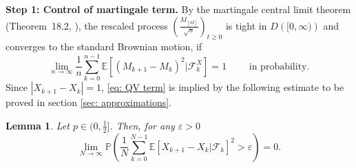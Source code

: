 \documentclass[twoside,12pt, a4paper]{article}
\newtheorem{lemma}{Lemma}[section]
\numberwithin{equation}{section}
\theoremstyle{remark}
\newcommand{\abs}[1]{\left\vert #1 \right\vert}
\begin{document}
	\vspace{1em}
	
	\textbf{Step 1: Control of martingale term.}
	 By the martingale central limit theorem (Theorem~18.2, \cite{B99}), the rescaled process $\left( \frac{M_{\left\lfloor n t \right\rfloor}}{\sqrt{n}} \right) _{t \ge 0}$ is tight in $D\left( [0,\infty ) \right) $ and converges to the standard Brownian motion, if
	\begin{equation}\label{eq: QV term}
		\lim_{n\to \infty}\frac{1}{n} \sum_{k=0}^{n-1}\mathbb{E}\left[ (M_{k+1}- M_{k})^2 |\mathcal{F}_k^X \right] =1 \qquad  \mbox{ in probability}.
	\end{equation}
	Since $\abs{X_{k+1}-X_k}=1$, \eqref{eq: QV term} is implied by the following estimate to be proved in section \ref{sec: approximations}. 
	\begin{lemma} \label{lm: control of martingale} 
		Let $p\in (0,\frac{1}{2}]$. Then, for any $\varepsilon >0$
		\begin{equation}\label{eq:  term}
			\lim_{N \to \infty }\mathbb{P}\left(\frac{1}{N} \sum_{k = 0}^{N-1} \mathbb{E}\left[ X_{k+1} - X_k | \mathcal{F}_k \right]^2 > \varepsilon \right) =0. 
		\end{equation}
	\end{lemma}
	\vspace{1em}
	
\end{document}
